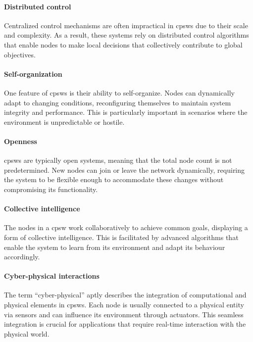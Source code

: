 \paragraph*{Distributed control}
Centralized control mechanisms are often impractical in \acp{cpsw} due to their scale and complexity. 
 As a result, 
 these systems rely on distributed control algorithms that enable nodes to make local decisions that collectively contribute to global objectives.

\paragraph*{Self-organization}
One feature of \acp{cpsw} is their ability to self-organize. 
Nodes can dynamically adapt to changing conditions, reconfiguring themselves to maintain system integrity and performance. 
This is particularly important in scenarios where the environment is unpredictable or hostile.

\paragraph*{Openness}
\acp{cpsw} are typically open systems, meaning that the total node count is not predetermined. 
New nodes can join or leave the network dynamically, requiring the system to be flexible enough to accommodate these changes without compromising its functionality.

\paragraph*{Collective intelligence}
The nodes in a \ac{cpsw} work collaboratively to achieve common goals, displaying a form of collective intelligence. 
This is facilitated by advanced algorithms that enable the system to learn from its environment and adapt its behaviour accordingly.

\paragraph*{Cyber-physical interactions}
The term ``cyber-physical'' aptly describes the integration of computational and physical elements in \acp{cpsw}. 
 Each node is usually connected to a physical entity via sensors and can influence its environment through actuators. 
 This seamless integration is crucial for applications that require real-time interaction with the physical world.

